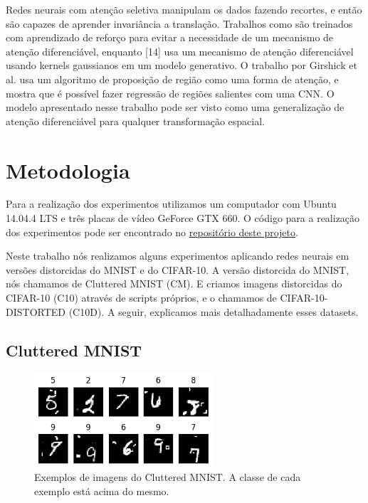 \documentclass[conference]{IEEEtran}
\begin{document}
Redes neurais com atenção seletiva manipulam os dados fazendo recortes, e então são capazes de aprender invariância a translação. Trabalhos como \cite{ba2014multiple,sermanet2014attention} são treinados com aprendizado de reforço para evitar a necessidade de um mecanismo de atenção diferenciável, enquanto [14] usa um mecanismo de atenção diferenciável usando kernels gaussianos em um modelo generativo. O trabalho por Girshick et al. \cite{girshick2014rich} usa um algoritmo de proposição de região como uma forma de atenção, e \cite{erhan2014scalable} mostra que é possível fazer regressão de regiões salientes com uma CNN. O modelo apresentado nesse trabalho pode ser visto como uma generalização de atenção diferenciável para qualquer transformação espacial.

\section{Metodologia}

Para a realização dos experimentos utilizamos um computador com Ubuntu 14.04.4 LTS e três placas de vídeo GeForce GTX 660. O código para a realização dos experimentos pode ser encontrado no \href{https://github.com/possatti/mestrado-dl-stn}{repositório deste projeto}.

Neste trabalho nós realizamos alguns experimentos aplicando redes neurais em versões distorcidas do MNIST e do CIFAR-10. A versão distorcida do MNIST, nós chamamos de Cluttered MNIST (CM). E criamos imagens distorcidas do CIFAR-10 (C10) através de scripts próprios, e o chamamos de CIFAR-10-DISTORTED (C10D).
A seguir, explicamos mais detalhadamente esses datasets.

\subsection{Cluttered MNIST}

\begin{figure}[ht!]
  \centering
  \includegraphics[width=250px]{img/CM-samples.png}
  \caption{Exemplos de imagens do  Cluttered MNIST. A classe de cada exemplo está acima do mesmo.}
  \label{fig:cm-samples}
\end{figure}
\end{document}
